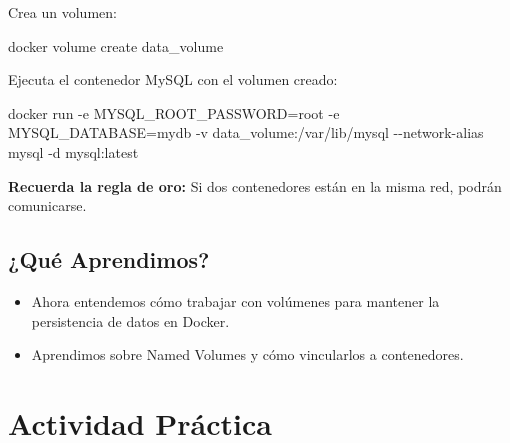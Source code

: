 \documentclass[
  a4paper,
  DIV=11,
  numbers=noendperiod,
  onepage,
  openany]{scrreprt}
\newenvironment{Shaded}{\begin{snugshade}}{\end{snugshade}}
\newcommand{\AttributeTok}[1]{\textcolor[rgb]{0.40,0.45,0.13}{#1}}
\newcommand{\ExtensionTok}[1]{\textcolor[rgb]{0.00,0.23,0.31}{#1}}
\newcommand{\NormalTok}[1]{\textcolor[rgb]{0.00,0.23,0.31}{#1}}
\providecommand{\tightlist}{%
  \setlength{\itemsep}{0pt}\setlength{\parskip}{0pt}}\usepackage{longtable,booktabs,array}
\begin{document}
Crea un volumen:

\begin{Shaded}
\begin{Highlighting}[]
\ExtensionTok{docker}\NormalTok{ volume create data\_volume}
\end{Highlighting}
\end{Shaded}

Ejecuta el contenedor MySQL con el volumen creado:

\begin{Shaded}
\begin{Highlighting}[]
\ExtensionTok{docker}\NormalTok{ run }\AttributeTok{{-}e}\NormalTok{ MYSQL\_ROOT\_PASSWORD=root }\AttributeTok{{-}e}\NormalTok{ MYSQL\_DATABASE=mydb }\AttributeTok{{-}v}\NormalTok{ data\_volume:/var/lib/mysql }\AttributeTok{{-}{-}network{-}alias}\NormalTok{ mysql }\AttributeTok{{-}d}\NormalTok{ mysql:latest}
\end{Highlighting}
\end{Shaded}

\begin{tcolorbox}[enhanced jigsaw, opacityback=0, titlerule=0mm, bottomtitle=1mm, arc=.35mm, toptitle=1mm, breakable, colframe=quarto-callout-tip-color-frame, left=2mm, leftrule=.75mm, coltitle=black, rightrule=.15mm, toprule=.15mm, colbacktitle=quarto-callout-tip-color!10!white, colback=white, bottomrule=.15mm, title=\textcolor{quarto-callout-tip-color}{\faLightbulb}\hspace{0.5em}{Tip}, opacitybacktitle=0.6]

\textbf{Recuerda la regla de oro:} Si dos contenedores están en la misma
red, podrán comunicarse.

\end{tcolorbox}

\hypertarget{quuxe9-aprendimos-1}{%
\section{¿Qué Aprendimos?}\label{quuxe9-aprendimos-1}}

\begin{itemize}
\tightlist
\item
  Ahora entendemos cómo trabajar con volúmenes para mantener la
  persistencia de datos en Docker.
\item
  Aprendimos sobre Named Volumes y cómo vincularlos a contenedores.
\end{itemize}

\hypertarget{actividad-pruxe1ctica-1}{%
\chapter{Actividad Práctica}\label{actividad-pruxe1ctica-1}}
\end{document}
